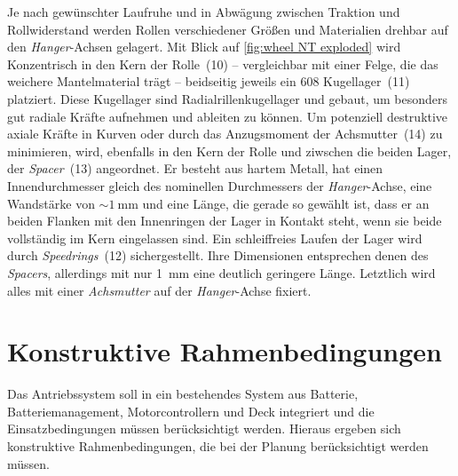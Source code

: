 		Je nach gewünschter Laufruhe und in Abwägung zwischen Traktion und Rollwiderstand werden Rollen verschiedener Größen und Materialien drehbar auf den \textit{Hanger}-Achsen gelagert.
		Mit Blick auf \cref{fig:wheel NT exploded} wird Konzentrisch in den Kern der Rolle~(10) -- vergleichbar mit einer Felge, die das weichere Mantelmaterial trägt -- beidseitig jeweils ein 608 Kugellager~(11) platziert.
		Diese Kugellager sind Radialrillenkugellager und gebaut, um besonders gut radiale Kräfte aufnehmen und ableiten zu können.
		Um potenziell destruktive axiale Kräfte in Kurven oder durch das Anzugsmoment der Achsmutter~(14) zu minimieren, wird, ebenfalls in den Kern der Rolle und ziwschen die beiden Lager, der \textit{Spacer}~(13) angeordnet.
		Er besteht aus hartem Metall, hat einen Innendurchmesser gleich des nominellen Durchmessers der \textit{Hanger}-Achse, eine Wandstärke von \(\sim \qty{1}{\milli\metre}\) und eine Länge, die gerade so gewählt ist, dass er an beiden Flanken mit den Innenringen der Lager in Kontakt steht, wenn sie beide vollständig im Kern eingelassen sind.
		Ein schleiffreies Laufen der Lager wird durch \textit{Speedrings}~(12) sichergestellt.
		Ihre Dimensionen entsprechen denen des \textit{Spacers}, allerdings mit nur \qty{1}{\milli\metre} eine deutlich geringere Länge.
		Letztlich wird alles mit einer \textit{Achsmutter} auf der \textit{Hanger}-Achse fixiert.
	\section{Konstruktive Rahmenbedingungen}\label{sec:constructive limitations}
		Das Antriebssystem soll in ein bestehendes System aus Batterie, Batteriemanagement, Motorcontrollern und Deck integriert und die Einsatzbedingungen müssen berücksichtigt werden.
		Hieraus ergeben sich konstruktive Rahmenbedingungen, die bei der Planung berücksichtigt werden müssen.

